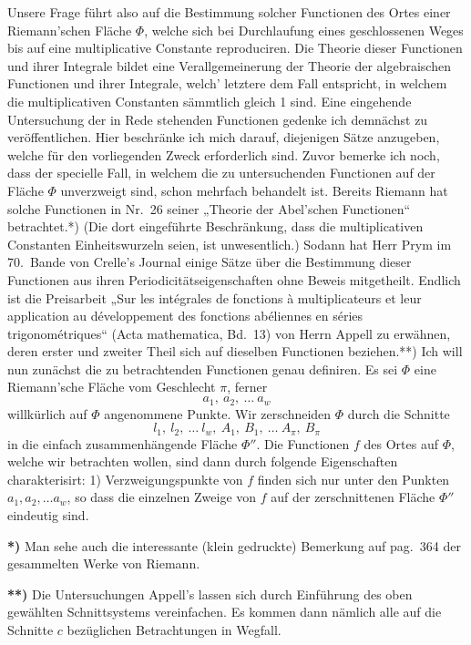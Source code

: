 \documentclass{article}
\begin{document}
Unsere Frage führt also auf die Bestimmung solcher Functionen des Ortes einer Riemann'schen Fläche $\Phi$, welche sich bei Durchlaufung eines geschlossenen Weges bis auf eine multiplicative Constante reproduciren. Die Theorie dieser Functionen und ihrer Integrale bildet eine Verallgemeinerung der Theorie der algebraischen Functionen und ihrer Integrale, welch' letztere dem Fall entspricht, in welchem die multiplicativen Constanten sämmtlich gleich 1 sind. Eine eingehende Untersuchung der in Rede stehenden Functionen gedenke ich demnächst zu veröffentlichen. Hier beschränke ich mich darauf, diejenigen Sätze anzugeben, welche für den vorliegenden Zweck erforderlich sind. Zuvor bemerke ich noch, dass der specielle Fall, in welchem die zu untersuchenden Functionen auf der Fläche $\Phi$ unverzweigt sind, schon mehrfach behandelt ist. Bereits Riemann hat solche Functionen in Nr.~26 seiner „Theorie der Abel'schen Functionen“ betrachtet.*) (Die dort eingeführte Beschränkung, dass die multiplicativen Constanten Einheitswurzeln seien, ist unwesentlich.) Sodann hat Herr Prym im 70.~Bande von Crelle's Journal einige Sätze über die Bestimmung dieser Functionen aus ihren Periodicitätseigenschaften ohne Beweis mitgetheilt. Endlich ist die Preisarbeit „Sur les intégrales de fonctions à multiplicateurs et leur application au développement des fonctions abéliennes en séries trigonométriques“ (Acta mathematica, Bd.~13) von Herrn Appell zu erwähnen, deren erster und zweiter Theil sich auf dieselben Functionen beziehen.**) Ich will nun zunächst die zu betrachtenden Functionen genau definiren. Es sei $\Phi$ eine Riemann'sche Fläche vom Geschlecht $\pi$, ferner
\[
a_1, \ a_2, \ \dots \ a_w
\]
willkürlich auf $\Phi$ angenommene Punkte. Wir zerschneiden $\Phi$ durch die Schnitte
\[
l_1, \ l_2, \ \dots \ l_w, \ A_1, \ B_1, \ \dots \ A_\pi, \ B_\pi
\]
in die einfach zusammenhängende Fläche $\Phi''$. Die Functionen $f$ des Ortes auf $\Phi$, welche wir betrachten wollen, sind dann durch folgende Eigenschaften charakterisirt:
1) Verzweigungspunkte von $f$ finden sich nur unter den Punkten $a_1, a_2, \dots a_w$, so dass die einzelnen Zweige von $f$ auf der zerschnittenen Fläche $\Phi''$ eindeutig sind.

\textbf{*)} Man sehe auch die interessante (klein gedruckte) Bemerkung auf pag.~364 der gesammelten Werke von Riemann.

\textbf{**)} Die Untersuchungen Appell's lassen sich durch Einführung des oben gewählten Schnittsystems vereinfachen. Es kommen dann nämlich alle auf die Schnitte $c$ bezüglichen Betrachtungen in Wegfall.
\end{document}
